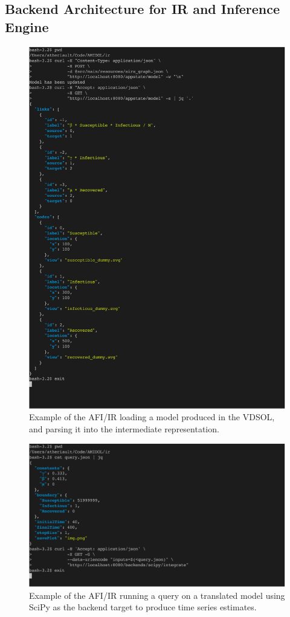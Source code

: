 \documentclass[11pt]{article}
\begin{document}
\subsection{Backend Architecture for IR and Inference Engine}

\begin{figure}
\includegraphics[width=\textwidth]{figs/LoadModel-crop.pdf}
\caption{Example of the AFI/IR loading a model produced in the VDSOL, and parsing it into the intermediate representation.}
\label{Fig:LoadModel}
\end{figure}

\begin{figure}
\includegraphics[width=\textwidth]{figs/QueryIntegrateBackend-crop.pdf}
\caption{Example of the AFI/IR running a query on a translated model using SciPy as the backend target to produce time series estimates.}
\label{Fig:Query}
\end{figure}
\end{document}
